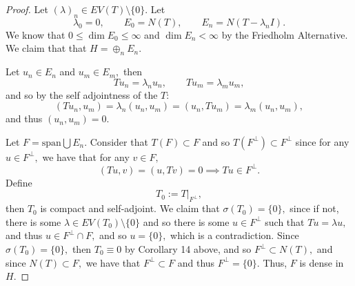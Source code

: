 \documentclass[10pt, oneside]{article}
\theoremstyle{definition}
\begin{document}
\begin{proof}
    Let $(\lambda)_n \in EV(T)\setminus\{0\}.$ Let 
    \[\lambda_0 = 0, \qquad E_0 = N(T), \qquad E_n = N(T - \lambda_n I).\] We know that $0 \leq \dim E_0 \leq\infty$ and $\dim E_n < \infty$ by the Friedholm Alternative. We claim that that $H = \oplus_{n}E_n.$ 

    Let $u_n \in E_n$ and $u_m \in E_m,$ then 
    \[Tu_n = \lambda_n u_n, \qquad Tu_m = \lambda_mu_m,\] and so by the self adjointness of the $T:$
    \[(Tu_n, u_m) = \lambda_n(u_n, u_m) = (u_n, Tu_m) = \lambda_m (u_n, u_m),\] and thus $(u_n, u_m) = 0.$

    Let $F = \text{span} \bigcup E_n.$ Consider that $T(F)\subset F$ and so $T(F^\perp)\subset F^\perp$ since for any $u \in F^\perp,$ we have that for any $v\in F,$ 
    \[(Tu, v) = (u, Tv) = 0 \implies Tu \in F^\perp.\] Define
    \[T_0:= T|_{F^\perp},\] then $T_0$ is compact and self-adjoint. We claim that $\sigma(T_0) = \{0\},$ since if not, there is some $\lambda \in EV(T_0) \setminus\{0\}$ and so there is some $u\in F^\perp$ such that $T u = \lambda u,$ and thus $u \in F^\perp \cap F,$ and so $u = \{0\},$ which is a contradiction. Since $\sigma(T_0) = \{0\},$ then $T_0 \equiv 0$ by Corollary 14 above, and so $F^\perp \subset N(T),$ and since $N(T)\subset F,$ we have that $F^\perp \subset F$ and thus $F^\perp = \{0\}.$ Thus, $F$ is dense in $H.$
\end{proof}

\newpage
\end{document}
